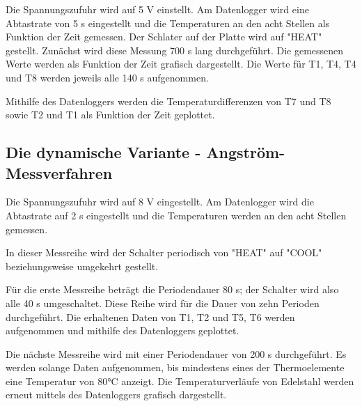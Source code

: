 Die Spannungszufuhr wird auf 5 V einstellt. Am Datenlogger wird eine Abtastrate von 5 s eingestellt und die Temperaturen an den acht Stellen als Funktion der Zeit gemessen.
Der Schlater auf der Platte wird auf "HEAT" gestellt.
Zunächst wird diese Messung 700 s lang durchgeführt.
Die gemessenen Werte werden als Funktion der Zeit grafisch dargestellt. Die Werte für T1, T4, T4 und T8 werden jeweils alle 140 s aufgenommen.

Mithilfe des Datenloggers werden die Temperaturdifferenzen von T7 und T8 sowie T2 und T1 als Funktion der Zeit geplottet.


\subsection{Die dynamische Variante - Angström-Messverfahren}

Die Spannungszufuhr wird auf 8 V eingestellt. Am Datenlogger wird die Abtastrate auf 2 s eingestellt und die Temperaturen werden an den acht Stellen gemessen.

In dieser Messreihe wird der Schalter periodisch von "HEAT" auf "COOL" beziehungsweise umgekehrt gestellt.

Für die  erste Messreihe beträgt die Periodendauer 80 s; der Schalter wird also alle 40 s umgeschaltet. Diese Reihe wird für die Dauer von zehn Perioden durchgeführt.
Die erhaltenen Daten von T1, T2 und T5, T6 werden aufgenommen und mithilfe des Datenloggers geplottet.

Die nächste Messreihe wird mit einer Periodendauer von 200 s durchgeführt. Es werden solange Daten aufgenommen, bis mindestens eines der Thermoelemente eine Temperatur von 80°C anzeigt. 
Die Temperaturverläufe von Edelstahl werden erneut mittels des Datenloggers grafisch dargestellt.